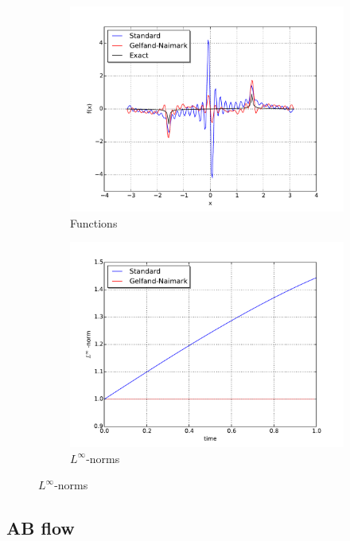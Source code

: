 \documentclass[12pt]{amsart}
\begin{document}
\begin{figure}
	\centering
	\begin{subfigure}{0.45\textwidth}
		\includegraphics[width=\textwidth]{./images/function_comparison.pdf}
		\caption{Functions}
		\label{fig:function}
	\end{subfigure}
	\begin{subfigure}{0.45\textwidth}
		\includegraphics[width=\textwidth]{./images/L_inf_plot.pdf}
		\caption{$L^{\infty}$-norms}
		\label{fig:sup norm}
	\end{subfigure}
\end{figure}

\subsection{AB flow}
\end{document}
